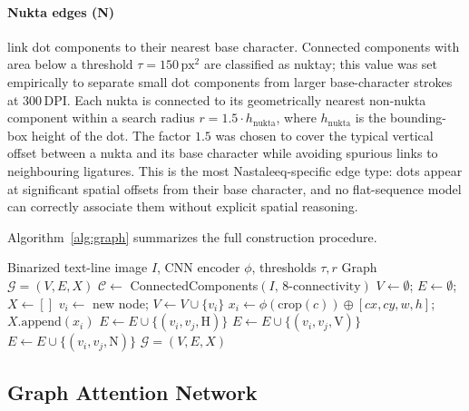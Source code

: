 \documentclass[11pt]{article}
\begin{document}
\paragraph{Nukta edges (N)} link dot components to their nearest base character.
Connected components with area below a threshold $\tau = 150\,\text{px}^2$ are
classified as nuktay; this value was set empirically to separate small dot components
from larger base-character strokes at 300\,DPI.
Each nukta is connected to its geometrically nearest non-nukta component within a search
radius $r = 1.5 \cdot h_{\text{nukta}}$, where $h_{\text{nukta}}$ is the bounding-box
height of the dot.
The factor $1.5$ was chosen to cover the typical vertical offset between a nukta and its
base character while avoiding spurious links to neighbouring ligatures.
This is the most Nastaleeq-specific edge type: dots appear at significant spatial offsets
from their base character, and no flat-sequence model can correctly associate them without
explicit spatial reasoning.

Algorithm~\ref{alg:graph} summarizes the full construction procedure.

\begin{algorithm}[ht]
\caption{Nastaleeq Graph Construction}
\label{alg:graph}
\begin{algorithmic}[1]
\Require Binarized text-line image $I$, CNN encoder $\phi$, thresholds $\tau, r$
\Ensure Graph $\mathcal{G} = (V, E, X)$
\State $\mathcal{C} \leftarrow$ ConnectedComponents$(I,\, 8\text{-connectivity})$
\State $V \leftarrow \emptyset$;\; $E \leftarrow \emptyset$;\; $X \leftarrow []$
  \State $v_i \leftarrow$ new node;\; $V \leftarrow V \cup \{v_i\}$
  \State $x_i \leftarrow \phi(\text{crop}(c)) \oplus [cx, cy, w, h]$;\; $X.\text{append}(x_i)$
\EndFor
{}
    \State $E \leftarrow E \cup \{(v_i, v_j, \text{H})\}$
    \State $E \leftarrow E \cup \{(v_i, v_j, \text{V})\}$
    \State $E \leftarrow E \cup \{(v_i, v_j, \text{N})\}$
  \EndIf
\EndFor
\State \Return $\mathcal{G} = (V, E, X)$
\end{algorithmic}
\end{algorithm}

\subsection{Graph Attention Network}
\label{sec:gat}
\end{document}
